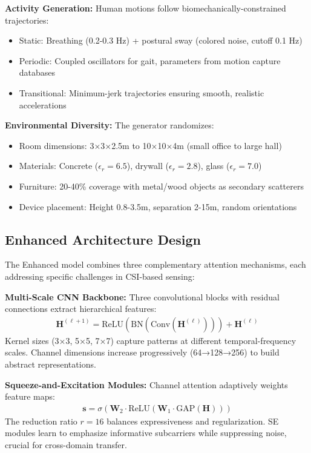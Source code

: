 \documentclass[journal]{IEEEtran}
\begin{document}
\textbf{Activity Generation:} Human motions follow biomechanically-constrained trajectories:
\begin{itemize}
\item Static: Breathing (0.2-0.3 Hz) + postural sway (colored noise, cutoff 0.1 Hz)
\item Periodic: Coupled oscillators for gait, parameters from motion capture databases
\item Transitional: Minimum-jerk trajectories ensuring smooth, realistic accelerations
\end{itemize}

\textbf{Environmental Diversity:} The generator randomizes:
\begin{itemize}
\item Room dimensions: 3×3×2.5m to 10×10×4m (small office to large hall)
\item Materials: Concrete ($\epsilon_r = 6.5$), drywall ($\epsilon_r = 2.8$), glass ($\epsilon_r = 7.0$)
\item Furniture: 20-40\% coverage with metal/wood objects as secondary scatterers
\item Device placement: Height 0.8-3.5m, separation 2-15m, random orientations
\end{itemize}

\subsection{Enhanced Architecture Design}
The Enhanced model combines three complementary attention mechanisms, each addressing specific challenges in CSI-based sensing:

\textbf{Multi-Scale CNN Backbone:} Three convolutional blocks with residual connections extract hierarchical features:
\begin{align}
\mathbf{H}^{(\ell+1)} = \text{ReLU}(\text{BN}(\text{Conv}(\mathbf{H}^{(\ell)}))) + \mathbf{H}^{(\ell)}
\end{align}
Kernel sizes (3×3, 5×5, 7×7) capture patterns at different temporal-frequency scales. Channel dimensions increase progressively (64→128→256) to build abstract representations.

\textbf{Squeeze-and-Excitation Modules:} Channel attention adaptively weights feature maps:
\begin{align}
\mathbf{s} = \sigma(\mathbf{W}_2 \cdot \text{ReLU}(\mathbf{W}_1 \cdot \text{GAP}(\mathbf{H})))
\end{align}
The reduction ratio $r=16$ balances expressiveness and regularization. SE modules learn to emphasize informative subcarriers while suppressing noise, crucial for cross-domain transfer.
\end{document}
